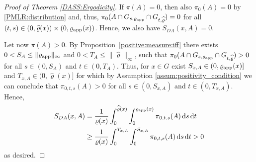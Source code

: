 \documentclass[sn-mathphys-num]{sn-jnl}%
\theoremstyle{thmstyleone}%
\theoremstyle{thmstyletwo}%
\theoremstyle{thmstylethree}%
\newcommand{\rhoapp}{\varrho_{{\rm app}}}
\begin{document}
\begin{appendices}
\begin{proof}[Proof of Theorem \ref{DASS:Ergodicity}]
If $\pi(A) = 0$, then also $\pi_0(A)=0$ by \eqref{PMLR:distribution} and, thus, $\pi_0(A \cap G_{s, \varrho_{\textmd{app}}}\cap G_{t, \widehat{\varrho}})=0$ for all $(t,s)\in (0,\widehat\varrho(x))\times(0,\rhoapp(x))$.
Hence, we also have $S_{DA}(x,A) = 0$.

Let now $\pi(A)>0$. By Proposition~\ref{positive:measure:iff} there exists $0<S_A\leq \|\rhoapp\|_\infty$ and $0<T_A\leq \|\widehat{\varrho}\|_\infty$, such that $\pi_0(A\cap G_{s, \varrho_{\textmd{app}}}\cap G_{t, \widehat{\varrho}}) > 0$ for all $s\in(0, S_A)$ and $t\in(0, T_A)$. Thus, for $x\in G$ exist $S_{x,A}\in(0, \rhoapp(x)]$ and $T_{x,A}\in(0, \widehat{\varrho}(x)]$ for which by Assumption \ref{assum:positivity_condition} we can conclude that $\pi_{0,t,s}(A)>0$ for all $s\in(0, S_{x,A})$ and $t\in(0, T_{x,A})$. 
Hence, 
\begin{align*}
	S_{DA}(x,A) 
    & = 
    \frac{1}{\varrho(x)}\int_0^{\widehat{\varrho}(x)} \int_0^{\rhoapp(x)} \pi_{0,t,s}(A)  \, \mathrm{d}s  \, \mathrm{d}t\\
    & \geq \frac{1}{\varrho(x)}\int_0^{T_{x,A}} \int_0^{S_{x,A}} \pi_{0,t,s}(A)  \, \mathrm{d}s  \, \mathrm{d}t
    > 0
\end{align*}
as desired. 
\end{proof}




\end{appendices}
\end{document}
